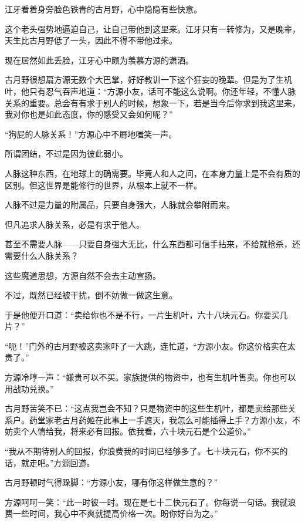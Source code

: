 
\begin{this_body}

江牙看着身旁脸色铁青的古月野，心中隐隐有些快意。

这个老头强势地逼迫自己，让自己带他到这里来。江牙只有一转修为，又是晚辈，天生比古月野低了一头，因此不得不带他过来。

现在居然如此丢脸，江牙心中颇为羡慕方源的潇洒。

古月野很想扇方源无数个大巴掌，好好教训一下这个狂妄的晚辈。但是为了生机叶，他只有忍气吞声地道：“方源小友，话可不能这么说啊。你还年轻，不懂人脉关系的重要。总会有有求于别人的时候，想象一下，若是当今后你求到我这里来，我对你也是如此态度，你的感受又会如何呢？”

“狗屁的人脉关系！”方源心中不屑地嗤笑一声。

所谓团结，不过是因为彼此弱小。

人脉这种东西，在地球上的确需要。毕竟人和人之间，在本身力量上是不会有质的区别。但这世界是能修行的世界，从根本上就不一样。

人脉不过是力量的附属品，只要自身强大，人脉就会攀附而来。

但凡追求人脉关系，必是有求于他人。

甚至不需要人脉——只要自身强大无比，什么东西都可信手拈来，不给就抢杀，还需要什么人脉关系？

这些魔道思想，方源自然不会去主动宣扬。

不过，既然已经被干扰，倒不妨做一做这生意。

于是他便开口道：“卖给你也不是不行，一片生机叶，六十八块元石。你要买几片？”

“呃！”门外的古月野被这卖家吓了一大跳，连忙道，“方源小友。你这价格实在太贵了。”

方源冷哼一声：“嫌贵可以不买。家族提供的物资中，也有生机叶售卖。你也可以用战功兑换。”

古月野苦笑不已：“这点我岂会不知？只是物资中的这些生机叶，都是卖给那些关系户。药堂家老古月药姬在此事上一手遮天，我怎么可能插得上手？方源小友，不妨卖个人情给我，将来必有回报。依我看，六十块元石是个公道价。”

“我从不期待别人的回报，你浪费我的时间已经够多了。七十块元石，你不买的话，就走吧。”方源回道。

古月野顿时气得跺脚：“方源小友，哪有你这样做生意的？”

方源呵呵一笑：“此一时彼一时。现在是七十二快元石了。你每说一句话。我就浪费一些时间，我心中不爽就提高价格一次。盼你好自为之。”


\end{this_body}
